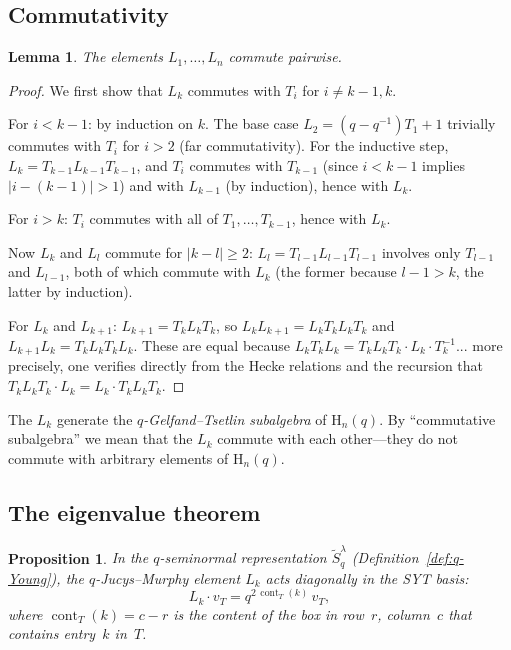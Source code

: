 \documentclass[12pt,a4paper]{article}
\newtheorem{proposition}[theorem]{Proposition}
\newtheorem{lemma}[theorem]{Lemma}
\theoremstyle{definition}
\theoremstyle{remark}
\newcommand{\cont}{\operatorname{cont}}
\begin{document}
\subsection{Commutativity}

\begin{lemma}\label{lem:q-JM-commute}
The elements $L_1, \ldots, L_n$ commute pairwise.
\end{lemma}

\begin{proof}
We first show that $L_k$ commutes with $T_i$ for $i \neq k{-}1, k$.

For $i < k{-}1$: by induction on $k$. The base case $L_2 =
(q-q^{-1})T_1 + 1$ trivially commutes with $T_i$ for $i > 2$ (far
commutativity). For the inductive step,
$L_k = T_{k-1} L_{k-1} T_{k-1}$, and $T_i$ commutes with $T_{k-1}$
(since $i < k{-}1$ implies $|i - (k{-}1)| > 1$) and with $L_{k-1}$
(by induction), hence with $L_k$.

For $i > k$: $T_i$ commutes with all of $T_1, \ldots, T_{k-1}$, hence
with $L_k$.

Now $L_k$ and $L_l$ commute for $|k - l| \geqslant 2$:
$L_l = T_{l-1} L_{l-1} T_{l-1}$ involves only $T_{l-1}$ and
$L_{l-1}$, both of which commute with $L_k$ (the former because
$l - 1 > k$, the latter by induction).

For $L_k$ and $L_{k+1}$: $L_{k+1} = T_k L_k T_k$, so
$L_k L_{k+1} = L_k T_k L_k T_k$ and
$L_{k+1} L_k = T_k L_k T_k L_k$. These are equal because
$L_k T_k L_k = T_k L_k T_k \cdot L_k \cdot T_k^{-1}$...
more precisely, one verifies directly from the Hecke relations and
the recursion that
$T_k L_k T_k \cdot L_k = L_k \cdot T_k L_k T_k$.
\end{proof}

The $L_k$ generate the \emph{$q$-Gelfand--Tsetlin subalgebra} of
$\mathrm{H}_n(q)$. By ``commutative subalgebra'' we mean that the
$L_k$ commute with each other---they do not commute with arbitrary
elements of $\mathrm{H}_n(q)$.

\subsection{The eigenvalue theorem}

\begin{proposition}\label{prop:q-JM-eigenvalues}
In the $q$-seminormal representation $\widetilde{S}_q^\lambda$
(Definition~\ref{def:q-Young}), the $q$-Jucys--Murphy element $L_k$
acts diagonally in the SYT basis:
\[
  L_k \cdot v_T = q^{2\,\cont_T(k)}\, v_T,
\]
where $\cont_T(k) = c - r$ is the content of the box in row~$r$,
column~$c$ that contains entry~$k$ in~$T$.
\end{proposition}
\end{document}
